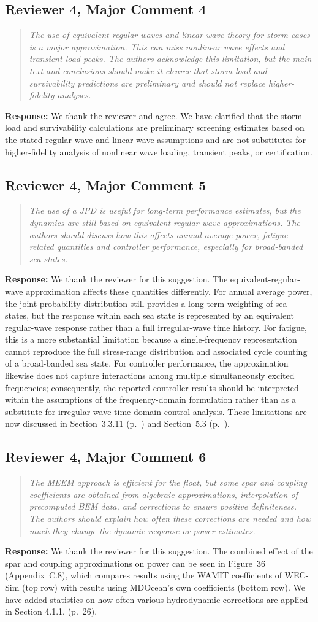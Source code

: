 \documentclass[11pt]{article}
\newcommand{\rcomment}[2]{\subsection*{#1}\begin{quote}\itshape #2\end{quote}}
\newcommand{\response}{\noindent\textbf{Response:} }
\begin{document}
\rcomment{Reviewer 4, Major Comment 4}{The use of equivalent regular waves and linear wave theory for storm cases is a major approximation. This can miss nonlinear wave effects and transient load peaks. The authors acknowledge this limitation, but the main text and conclusions should make it clearer that storm-load and survivability predictions are preliminary and should not replace higher-fidelity analyses.}
\response We thank the reviewer and agree. We have clarified that the storm-load and survivability calculations are preliminary screening estimates based on the stated regular-wave and linear-wave assumptions and are not substitutes for higher-fidelity analysis of nonlinear wave loading, transient peaks, or certification.

\rcomment{Reviewer 4, Major Comment 5}{The use of a JPD is useful for long-term performance estimates, but the dynamics are still based on equivalent regular-wave approximations. The authors should discuss how this affects annual average power, fatigue-related quantities and controller performance, especially for broad-banded sea states.}
\response We thank the reviewer for this suggestion. The equivalent-regular-wave approximation affects these quantities differently.
For annual average power, the joint probability distribution still provides a long-term weighting of sea states, but the response within each sea state is represented by an equivalent regular-wave response rather than a full irregular-wave time history.
For fatigue, this is a more substantial limitation because a single-frequency representation cannot reproduce the full stress-range distribution and associated cycle counting of a broad-banded sea state.
For controller performance, the approximation likewise does not capture interactions among multiple simultaneously excited frequencies; consequently, the reported controller results should be interpreted within the assumptions of the frequency-domain formulation rather than as a substitute for irregular-wave time-domain control analysis. These limitations are now discussed in Section~3.3.11 (p.~\pageref{aor:sec:irregular-waves}) and Section~5.3 (p.~\pageref{aor:sec:unmodeled-effects}).

\rcomment{Reviewer 4, Major Comment 6}{The MEEM approach is efficient for the float, but some spar and coupling coefficients are obtained from algebraic approximations, interpolation of precomputed BEM data, and corrections to ensure positive definiteness. The authors should explain how often these corrections are needed and how much they change the dynamic response or power estimates.}
\response We thank the reviewer for this suggestion. The combined effect of the spar and coupling approximations on power can be seen in Figure~36 (Appendix~C.8), which compares results using the WAMIT coefficients of WEC-Sim (top row) with results using MDOcean's own coefficients (bottom row).
We have added statistics on how often various hydrodynamic corrections are applied in Section 4.1.1. (p.~26).
\end{document}
